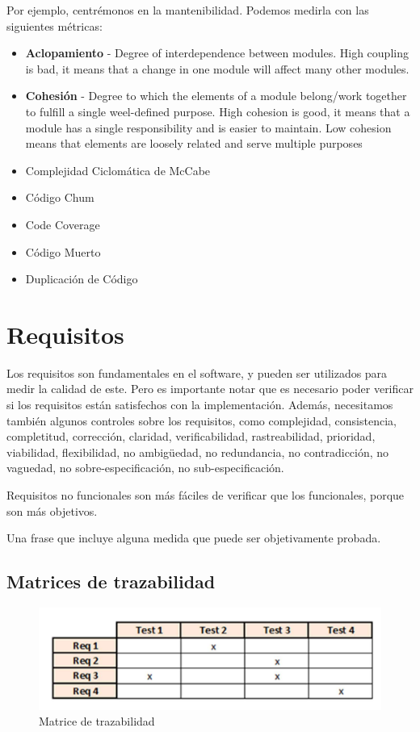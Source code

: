 Por ejemplo, centrémonos en la mantenibilidad. Podemos medirla con las siguientes métricas:
\begin{itemize}
   \item \textbf{Aclopamiento} - Degree of interdependence between modules. High coupling is bad, it means that a change in one module will affect many other modules.
   \item \textbf{Cohesión} - Degree to which the elements of a module belong/work together to fulfill a single weel-defined purpose. High cohesion is good, it means that a module has a single responsibility and is easier to maintain. Low cohesion means that elements are loosely related and serve multiple purposes
   \item Complejidad Ciclomática de McCabe
   \item Código Chum
   \item Code Coverage
   \item Código Muerto
   \item Duplicación de Código
\end{itemize}


\section{Requisitos}
Los requisitos son fundamentales en el software, y pueden ser utilizados para medir la calidad de este. 
Pero es importante notar que es necesario poder verificar si los requisitos están satisfechos con la implementación.
Además, necesitamos también algunos controles sobre los requisitos, como complejidad, consistencia, completitud, corrección, claridad, verificabilidad, rastreabilidad, prioridad, viabilidad, flexibilidad, no ambigüedad, no redundancia, no contradicción, no vaguedad, no sobre-especificación, no sub-especificación.

Requisitos no funcionales son más fáciles de verificar que los funcionales, porque son más objetivos.
\begin{definition}
   Una frase que incluye alguna medida que puede ser objetivamente probada.
\end{definition}

\subsection{Matrices de trazabilidad}

\begin{figure}[htbp]
   \centering
   \includegraphics{images/01/matriceTrazabilidad.png}
   \caption{Matrice de trazabilidad}
   \label{fig:01/matriceTrazabilidad}
\end{figure}

